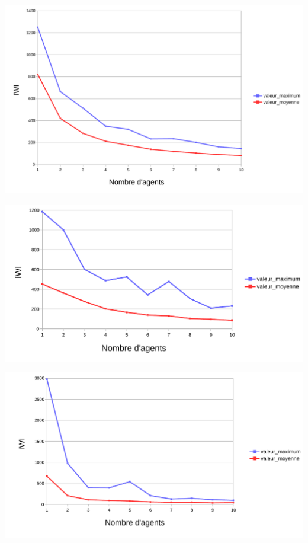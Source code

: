 \documentclass{article}
\begin{document}
    \begin{center}
        \includegraphics[width = \textwidth]{graphes pdf/variance tortues IWI.pdf}
    \end{center}
    \begin{center}
        \includegraphics[width = \textwidth]{graphes pdf/variance tortues IWI corridor.pdf}
    \end{center}
    \begin{center}
        \includegraphics[width = \textwidth]{graphes pdf/variance tortues IWI spirale.pdf}
    \end{center}
\end{document}
